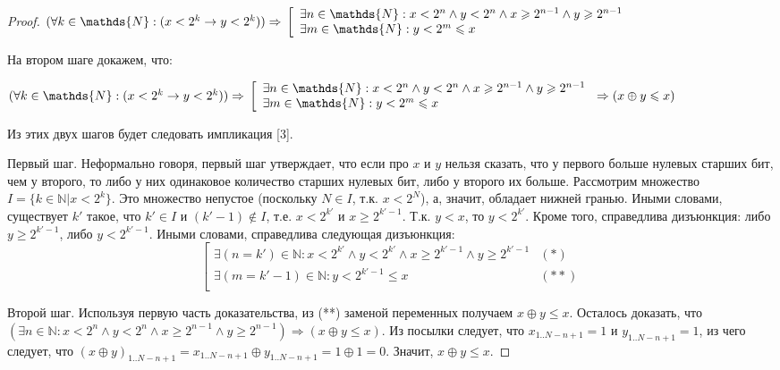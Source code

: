 \begin{proof}
$( \forall k \in \mathds{N} : (x < 2^k \rightarrow y < 2^k )) \Rightarrow\\
\left[\begin{array}{l}
\exists n \in \mathds{N} : x < 2^n \wedge y < 2^n \wedge x \geqslant 2^{n-1} \wedge y \geqslant 2^{n-1}\\
\exists m \in \mathds{N} : y < 2^m \leqslant x\\
\end{array}\right.$

На втором шаге докажем, что:

$( \forall k \in \mathds{N} : (x < 2^k \rightarrow y < 2^k )) \Rightarrow\\
\left[\begin{array}{l}
\exists n \in \mathds{N} : x < 2^n \wedge y < 2^n \wedge x \geqslant 2^{n-1} \wedge y \geqslant 2^{n-1}\\
\exists m \in \mathds{N} : y < 2^m \leqslant x\\
\end{array}\right. \Rightarrow (x \oplus y \leqslant x)$

Из этих двух шагов будет следовать импликация [3].

Первый шаг. Неформально говоря, первый шаг утверждает, что если про $x$ и $y$ нельзя сказать, что у первого больше нулевых старших бит, чем у второго, то либо у них одинаковое количество старших нулевых бит, либо у второго их больше. Рассмотрим множество $I = \{k \in \mathds{N} | x < 2^k\}$. Это множество непустое (поскольку $N \in I$, т.к. $x < 2^N$), а, значит, обладает нижней гранью. Иными словами, существует $k'$ такое, что $k' \in I$ и $(k'{-}1) \notin I$, т.е. $x < 2^{k'}$ и $x \geqslant 2^{k'-1}$. Т.к. $y < x$, то $y < 2^{k'}$. Кроме того, справедлива дизъюнкция: либо $y \geqslant 2^{k'-1}$, либо $y < 2^{k'-1}$. Иными словами, справедлива следующая дизъюнкция:
$$\left[\begin{array}{lc}
\exists (n = k') \in \mathds{N} : x < 2^{k'} \wedge y < 2^{k'} \wedge x \geqslant 2^{k'-1} \wedge y \geqslant 2^{k'-1} & (*)\\
\exists (m = k'{-}1) \in \mathds{N} : y < 2^{k'-1} \leqslant x & (**)\\
\end{array}\right.$$

Второй шаг. Используя первую часть доказательства, из (**) заменой переменных получаем $x \oplus y \leqslant x$. Осталось доказать, что $(\exists n \in \mathds{N} : x < 2^n \wedge y < 2^n \wedge x \geqslant 2^{n-1} \wedge y \geqslant 2^{n-1}) \Rightarrow (x \oplus y \leqslant x)$. Из посылки следует, что $x_{1..N-n+1} = 1$ и $y_{1..N-n+1} = 1$, из чего следует, что $(x \oplus y)_{1..N-n+1} = x_{1..N-n+1} \oplus y_{1..N-n+1} = 1 \oplus 1 = 0$. Значит, $x\oplus y \leqslant x$.
\end{proof}

